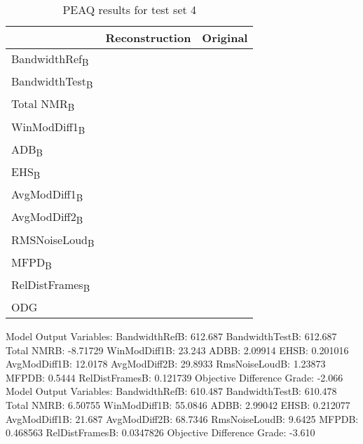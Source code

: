 \begin{table}\begin{center}
\caption{PEAQ results for test set 4}
\label{tab:PEAQdata2}
\begin{tabular}{|l|c|c|}
  \hline
                                    & Reconstruction & Original \\ \hline
  BandwidthRef\textsubscript{B}     &                & \\ 
  BandwidthTest\textsubscript{B}    &                & \\
  Total NMR\textsubscript{B}        &                & \\
  WinModDiff1\textsubscript{B}      &                & \\
  ADB\textsubscript{B}              &                & \\
  EHS\textsubscript{B}              &                & \\
  AvgModDiff1\textsubscript{B}      &                & \\
  AvgModDiff2\textsubscript{B}      &                & \\
  RMSNoiseLoud\textsubscript{B}     &                & \\
  MFPD\textsubscript{B}             &                & \\
  RelDistFrames\textsubscript{B}    &                & \\
  ODG                               &                & \\
  \hline
\end{tabular}
\end{center}\end{table}



Model Output Variables:
   BandwidthRefB: 612.687
  BandwidthTestB: 612.687
      Total NMRB: -8.71729
    WinModDiff1B: 23.243
            ADBB: 2.09914
            EHSB: 0.201016
    AvgModDiff1B: 12.0178
    AvgModDiff2B: 29.8933
   RmsNoiseLoudB: 1.23873
           MFPDB: 0.5444
  RelDistFramesB: 0.121739
Objective Difference Grade: -2.066
Model Output Variables:
   BandwidthRefB: 610.487
  BandwidthTestB: 610.478
      Total NMRB: 6.50755
    WinModDiff1B: 55.0846
            ADBB: 2.99042
            EHSB: 0.212077
    AvgModDiff1B: 21.687
    AvgModDiff2B: 68.7346
   RmsNoiseLoudB: 9.6425
           MFPDB: 0.468563
  RelDistFramesB: 0.0347826
Objective Difference Grade: -3.610

